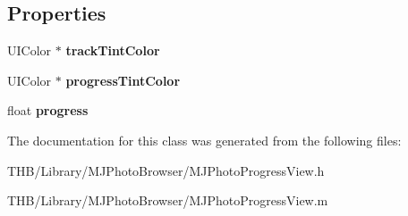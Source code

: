 \subsection*{Properties}
\begin{DoxyCompactItemize}
\item 
\mbox{\label{interface_m_j_photo_progress_view_aa8fcea6113e326de6a2d13c895bf7637}} 
U\+I\+Color $\ast$ {\bfseries track\+Tint\+Color}
\item 
\mbox{\label{interface_m_j_photo_progress_view_af56400b86ba440cb755d24ce5d8544f6}} 
U\+I\+Color $\ast$ {\bfseries progress\+Tint\+Color}
\item 
\mbox{\label{interface_m_j_photo_progress_view_a8cd11fc17295db98a91ac6392b0e507e}} 
float {\bfseries progress}
\end{DoxyCompactItemize}


The documentation for this class was generated from the following files\+:\begin{DoxyCompactItemize}
\item 
T\+H\+B/\+Library/\+M\+J\+Photo\+Browser/M\+J\+Photo\+Progress\+View.\+h\item 
T\+H\+B/\+Library/\+M\+J\+Photo\+Browser/M\+J\+Photo\+Progress\+View.\+m\end{DoxyCompactItemize}
